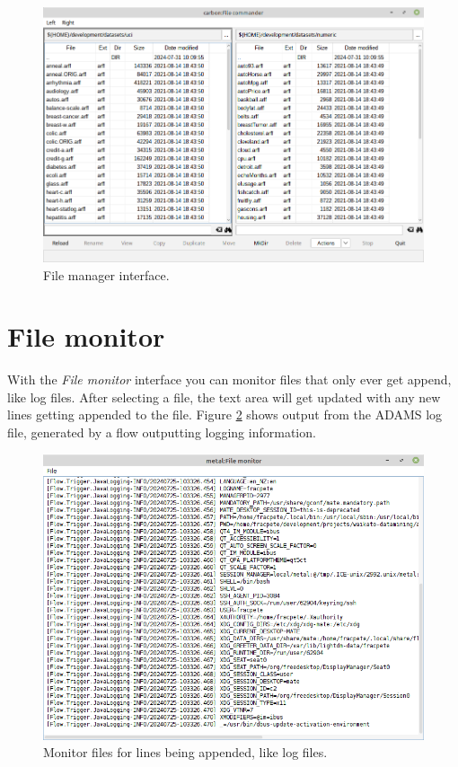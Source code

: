 \begin{figure}[htb]
  \centering
  \includegraphics[width=12.0cm]{images/filecommander.png}
  \caption{File manager interface.}
  \label{filecommander}
\end{figure}

\clearpage
\section{File monitor}
With the \textit{File monitor} interface you can monitor files that only
ever get append, like log files. After selecting a file, the text area
will get updated with any new lines getting appended to the file.
Figure \ref{filemonitor} shows output from the ADAMS log file, generated by a
flow outputting logging information.

\begin{figure}[htb]
  \centering
  \includegraphics[width=12.0cm]{images/filemonitor.png}
  \caption{Monitor files for lines being appended, like log files.}
  \label{filemonitor}
\end{figure}

